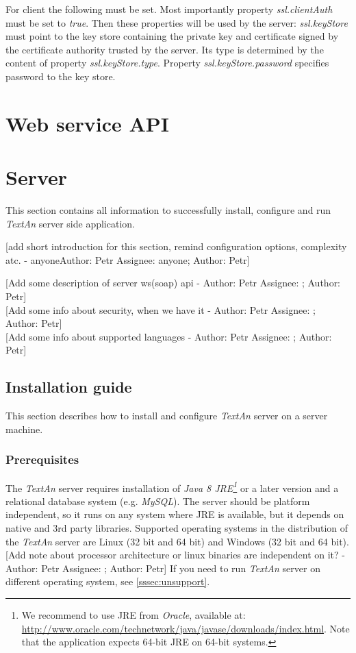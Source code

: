 \documentclass[12pt,a4paper]{report}
\makeatletter
\newcommand{\comment}[3][\@empty]{
  {\color{magenta}[#3 - }
  {\color{green}\ifx\@empty#1\relax Author: #2 \else Assignee: #1; Author: #2\fi}{\color{magenta}]}
}
\newcommand{\textan}{\emph{TextAn}}
\makeatother
\begin{document}
For client the following must be set. Most importantly property
\emph{ssl.clientAuth} must be set to \emph{true}. Then these properties will be
used by the server: \emph{ssl.keyStore} must point to the key store containing
the private key and certificate signed by the certificate authority trusted by
the server. Its type is determined by the content of property
\emph{ssl.keyStore.type}. Property \emph{ssl.keyStore.password} specifies password to the key store.

\section{Web service API}

\section{Server}
This section contains all information to successfully install, configure and run
\textan{} server side application.
\comment[anyone]{Petr}{add short introduction for this section, remind configuration
options, complexity atc.}

\comment{Petr}{Add some description of server ws(soap) api}\\
\comment{Petr}{Add some info about security, when we have it}\\
\comment{Petr}{Add some info about supported languages}

\subsection{Installation guide}

This section describes how to install and configure \textan{} server on a server
machine.

\subsubsection{Prerequisites}
\label{sssec:SerInstPre}

The \textan{} server requires installation of \emph{Java 8 JRE\footnote{We
recommend to use JRE from \emph{Oracle}, available at:
\url{http://www.oracle.com/technetwork/java/javase/downloads/index.html}.
Note that the application expects 64-bit JRE on 64-bit systems.}}
or a later version and a relational database system (e.g. \emph{MySQL}).
The server should be platform independent, so it runs on any system where JRE
is available, but it depends on native and 3rd party libraries. Supported operating
systems in the distribution of the \textan{} server are Linux (32 bit and 64 bit)
and Windows (32 bit and 64 bit). \comment{Petr}{Add note about processor architecture
or linux binaries are independent on it?} If you need to run \textan{} server on
different operating system, see \ref{sssec:unsupport}.
\end{document}
